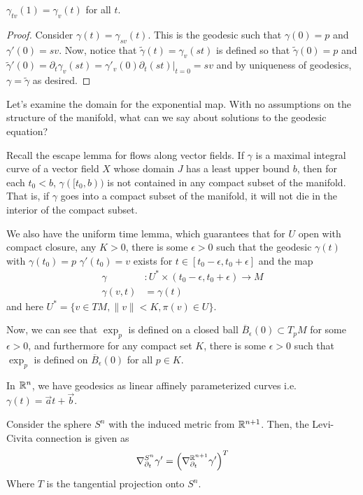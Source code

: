 \documentclass[../main.tex]{subfiles}
\begin{document}
\begin{lemma}
    $\gamma_{tv}(1) = \gamma_v(t)$ for all $t$. 
\end{lemma}
\begin{proof}
    Consider $\gamma(t) = \gamma_{sv}(t)$. This is the geodesic such that
    $\gamma(0)=p$ and $\gamma'(0)=sv$. Now, notice that $\tilde{\gamma}(t) =
    \gamma_v(st)$ is defined so that $\tilde{\gamma}(0)=p$ and
    $\tilde{\gamma}'(0) = \partial_t\gamma_v(st) =
    \gamma'_v(0)\partial_t(st)|_{t=0} = sv$ and by uniqueness of geodesics,
    $\gamma = \tilde{\gamma}$ as desired.
\end{proof}

Let's examine the domain for the exponential map. With no assumptions on the
structure of the manifold, what can we say about solutions to the geodesic
equation?

Recall the escape lemma for flows along vector fields. If $\gamma$ is a maximal
integral curve of a vector field $X$ whose domain $J$ has a least upper bound
$b$, then for each $t_0<b$, $\gamma([t_0,b))$ is not contained in any compact
subset of the manifold. That is, if $\gamma$ goes into a compact subset of the
manifold, it will not die in the interior of the compact subset.

We also have the uniform time lemma, which guarantees that for $U$ open with
compact closure, any $K>0$, there is some $\epsilon>0$ such that the geodesic
$\gamma(t)$ with $\gamma(t_0)=p$ $\gamma'(t_0)=v$ exists for
$t\in[t_0-\epsilon,t_0+\epsilon]$ and the map
\[
    \begin{aligned}
        \gamma&:U^*\times (t_0-\epsilon,t_0+\epsilon)\to M\\
        \gamma(v,t) &= \gamma(t)
    \end{aligned}
\]
and here $U^* = \{v\in TM, \|v\|<K,\pi(v)\in U\}$.

Now, we can see that $\exp_p$ is defined on a closed ball
$\overline{B}_{\epsilon}(0)\subset T_pM$ for some $\epsilon>0$, and furthermore for
any compact set $K$, there is some $\epsilon>0$ such that $\exp_p$ is defined on
$\overline{B}_{\epsilon}(0)$ for all $p\in K$.

In $\mathbb{R}^n$, we have geodesics as linear affinely parameterized curves i.e.
$\gamma(t) = \vec{a}t+\vec{b}$.

\begin{ex}
    Consider the sphere $S^n$ with the induced metric from $\mathbb{R}^{n+1}$. Then, the
    Levi-Civita connection is given as
    \[
        \nabla^{S^n}_{\partial_t}\gamma' =
        \left(\nabla^{\mathbb{R}^{n+1}}_{\partial_t}\gamma'\right)^T
    \]
    Where $T$ is the tangential projection onto $S^n$.
\end{ex}
\end{document}
